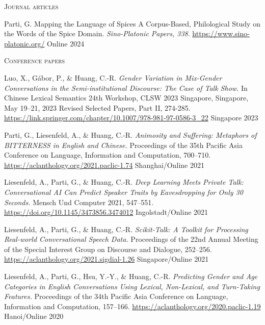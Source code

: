 
\textsc{Journal articles}

\begin{cvhonors}

  \cvhonor
  {Parti, G.} %
  {Mapping the Language of Spices A Corpus-Based, Philological Study on the Words of the Spice Domain. \textit{Sino-Platonic Papers, 338}. \url{https://www.sino-platonic.org/}} %
  {Online} %
  {2024} %

\end{cvhonors}

\textsc{Conference papers}

\begin{cvhonors}

\cvhonor
{Luo, X., Gábor, P., \& Huang, C.-R.} %
{\textit{Gender Variation in Mix-Gender Conversations in the Semi-institutional Discourse: The Case of Talk Show.} In Chinese Lexical Semantics 24th Workshop, CLSW 2023
Singapore, Singapore, May 19–21, 2023 Revised Selected Papers, Part II, 274-285. \url{https://link.springer.com/chapter/10.1007/978-981-97-0586-3_22}} %
{Singapore} %
{2023} %

\cvhonor
{Parti, G., Liesenfeld, A., \& Huang, C.-R.} %
{\textit{Animosity and Suffering: Metaphors of BITTERNESS in English and Chinese.} Proceedings of the 35th Pacific Asia Conference on Language, Information and Computation, 700–710. \url{https://aclanthology.org/2021.paclic-1.74}} %
{Shanghai/Online} %
{2021} %

\cvhonor
{Liesenfeld, A., Parti, G., \& Huang, C.-R.} %
{\textit{Deep Learning Meets Private Talk: Conversational AI Can Predict Speaker Traits by Eavesdropping for Only 30 Seconds.} Mensch Und Computer 2021, 547–551. \url{https://doi.org/10.1145/3473856.3474012}} %
{Ingolstadt/Online} %
{2021} %

\cvhonor
{Liesenfeld, A., Parti, G., \& Huang, C.-R.} %
{\textit{Scikit-Talk: A Toolkit for Processing Real-world Conversational Speech Data.} Proceedings of the 22nd Annual Meeting of the Special Interest Group on Discourse and Dialogue, 252–256. \url{https://aclanthology.org/2021.sigdial-1.26}} %
{Singapore/Online} %
{2021} %

\cvhonor
{Liesenfeld, A., Parti, G., Hsu, Y.-Y., \& Huang, C.-R.} %
{\textit{Predicting Gender and Age Categories in English Conversations Using Lexical, Non-Lexical, and Turn-Taking Features.} Proceedings of the 34th Pacific Asia Conference on Language, Information and Computation, 157–166. \url{https://aclanthology.org/2020.paclic-1.19}} %
{Hanoi/Online} %
{2020} %

\end{cvhonors}

